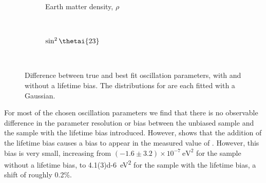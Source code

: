 \begin{figure}[h]
	\begin{subfigure}[t]{.49\textwidth}
		\begin{adjustbox}{max totalsize=\textwidth, center}
			
		\end{adjustbox}
		\caption{}
	\end{subfigure}
	\hfill
	\begin{subfigure}[t]{.49\textwidth}
		\begin{adjustbox}{max totalsize=\textwidth, center}
			
		\end{adjustbox}
		\caption{Earth matter density, $\rho$}
	\end{subfigure}
	\\
	\begin{subfigure}[t]{.49\textwidth}
		\begin{adjustbox}{max totalsize=\textwidth, center}
			
		\end{adjustbox}
		\caption{$\sin^{2} \thetai{23}$}
	\end{subfigure}
	\hfill
	\begin{subfigure}[t]{.49\textwidth}
		\begin{adjustbox}{max totalsize=\textwidth, center}
			
		\end{adjustbox}
		\caption{\dcp}
	\end{subfigure}	
	\\
	\centering
	\begin{subfigure}[t]{.5\textwidth}
		\begin{adjustbox}{max totalsize=\textwidth, center}
			
		\end{adjustbox}
		\caption{}
		\label{fig:paramComp5pc:dmsq32}
	\end{subfigure}
	\caption[Difference between true and best fit oscillation parameters, with and without a lifetime bias.]{Difference between true and best fit oscillation parameters, with and without a lifetime bias. The distributions for  are each fitted with a Gaussian.}
	\label{fig:paramComp5pc}
\end{figure}

For most of the chosen oscillation parameters we find that there is no observable difference in the parameter resolution or bias between the unbiased sample and the sample with the lifetime bias introduced.
However,  shows that the addition of the lifetime bias causes a bias to appear in the measured value of . 
However, this bias is very small, increasing from $(-1.6 \pm 3.2) \times 10^{-7}~\si{\eV\squared}$ for the sample without a lifetime bias, to \SI{4.1(3)d-6}{\eV\squared} for the sample with the lifetime bias, a shift of roughly 0.2\%.

